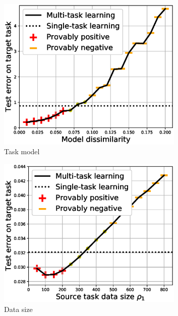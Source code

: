 \begin{figure}
	\begin{subfigure}[b]{0.32\textwidth}
		\centering
		\includegraphics[width=0.98\textwidth]{figures/model_shift_phase_transition.eps}
		\caption{Task model}
		\label{fig_model_shift}
	\end{subfigure}\hfill
	\begin{subfigure}[b]{0.32\textwidth}
		\centering
		\includegraphics[width=0.98\textwidth]{figures/datapoints_phase_transition.eps}
		\caption{Data size}
	\end{subfigure}\hfill
	\begin{subfigure}[b]{0.32\textwidth}

\end{subfigure}
\end{figure}
